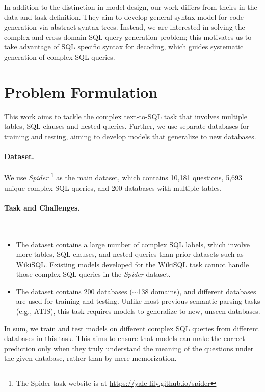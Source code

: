 \documentclass[11pt,a4paper]{article}
\begin{document}
In addition to the distinction in model design, our work differs from theirs in the data and task definition.
They aim to develop general syntax model for code generation via abstract syntax trees. Instead, we are interested in solving the complex and cross-domain SQL query generation problem; this motivates us to take advantage of SQL specific syntax for decoding, which guides systematic generation of complex SQL queries.






\section{Problem Formulation}
This work aims to tackle the complex text-to-SQL task that involves multiple tables, SQL clauses and nested queries.
Further, we use separate databases for training and testing, aiming to develop models that generalize to new databases.


\paragraph{Dataset.}
We use \textit{Spider} \cite{Yu&al.18.emnlp.corpus} \footnote{The Spider task website is at \url{https://yale-lily.github.io/spider}} as the main dataset, which contains 10,181 questions, 5,693 unique complex SQL queries, and 200 databases with multiple tables. 








\paragraph{Task and Challenges.}~\vspace{-1.5mm}
\begin{itemize}
\setlength{\itemsep}{0mm}
\setlength{\leftskip}{-4mm}
    \item The dataset contains a large number of complex SQL labels, which involve more tables, SQL clauses, and nested queries than prior datasets such as WikiSQL. Existing models developed for the WikiSQL task cannot handle those complex SQL queries in the \textit{Spider} dataset.
    
    \item The dataset contains 200 databases ($\sim$138 domains), and different databases are used for training and testing.
    Unlike most previous semantic parsing tasks (e.g., ATIS), this task requires models to generalize to new, unseen databases.


\end{itemize}\vspace{-2mm}
In sum, we train and test models on different complex SQL queries from different databases in this task. This aims to ensure that models can make the correct prediction only when they truly understand the meaning of the questions under the given database, rather than by mere memorization.
\end{document}
